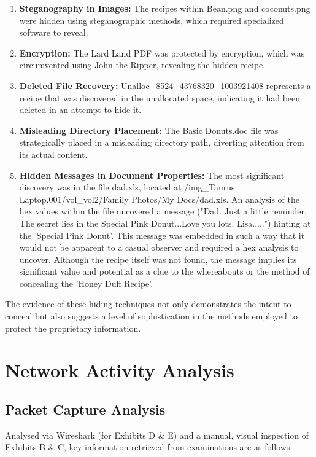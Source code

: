 \begin{enumerate}
    \item \textbf{Steganography in Images:} The recipes within Bean.png and coconuts.png were hidden using steganographic methods, which required specialized software to reveal.
    
    \item \textbf{Encryption:} The Lard Land PDF was protected by encryption, which was circumvented using John the Ripper, revealing the hidden recipe.
    
    \item \textbf{Deleted File Recovery:} Unalloc\_8524\_43768320\_1003921408 represents a recipe that was discovered in the unallocated space, indicating it had been deleted in an attempt to hide it.
    
    \item \textbf{Misleading Directory Placement:} The Basic Donuts.doc file was strategically placed in a misleading directory path, diverting attention from its actual content.
    
    \item \textbf{Hidden Messages in Document Properties:} The most significant discovery was in the file dad.xls, located at /img\_Taurus Laptop.001/vol\_vol2/Family Photos/My Docs/dad.xls. An analysis of the hex values within the file uncovered a message ("Dad. Just a little reminder. The secret lies in the Special Pink Donut...Love you lots. Lisa.....") hinting at the 'Special Pink Donut'. This message was embedded in such a way that it would not be apparent to a casual observer and required a hex analysis to uncover. Although the recipe itself was not found, the message implies its significant value and potential as a clue to the whereabouts or the method of concealing the 'Honey Duff Recipe'.
\end{enumerate}

The evidence of these hiding techniques not only demonstrates the intent to conceal but also suggests a level of sophistication in the methods employed to protect the proprietary information.

\section{Network Activity Analysis}

\subsection{Packet Capture Analysis}
Analysed via Wireshark (for Exhibits D \& E) and a manual, visual inspection of Exhibits B \& C, key information retrieved from examinations are as follows:

